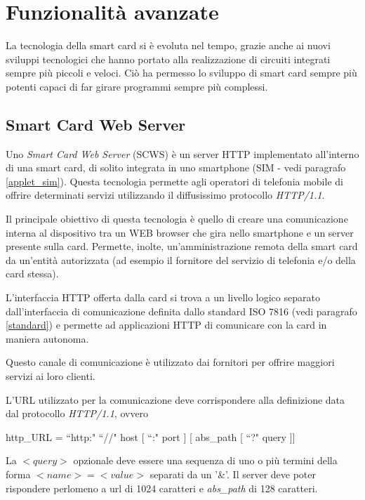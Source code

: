 \section{Funzionalità avanzate}
La tecnologia della smart card si è evoluta nel tempo, grazie anche ai nuovi sviluppi tecnologici che hanno portato alla realizzazione di circuiti integrati sempre più piccoli e veloci. Ciò ha permesso lo sviluppo di smart card sempre più potenti capaci di far girare programmi sempre più complessi.

\subsection{Smart Card Web Server}
\label{smart_card_web_server}
Uno \textit{Smart Card Web Server} (SCWS) è un server HTTP implementato all'interno di una smart card, di solito integrata in uno smartphone (SIM - vedi paragrafo \ref{applet_sim}). Questa tecnologia permette agli operatori di telefonia mobile di offrire determinati servizi utilizzando il diffusissimo protocollo \textit{HTTP/1.1}.

Il principale obiettivo di questa tecnologia è quello di creare una comunicazione interna al dispositivo tra un WEB browser che gira nello smartphone e un server presente sulla card. Permette, inolte, un'amministrazione remota della smart card da un'entità autorizzata (ad esempio il fornitore del servizio di telefonia e/o della card stessa).

L'interfaccia HTTP offerta dalla card si trova a un livello logico separato dall'interfaccia di comunicazione definita dallo standard ISO 7816 (vedi paragrafo \ref{standard}) e permette ad applicazioni HTTP di comunicare con la card in maniera autonoma.

Questo canale di comunicazione è utilizzato dai fornitori per offrire maggiori servizi ai loro clienti.

L'URL utilizzato per la comunicazione deve corrispondere alla definizione data dal protocollo \textit{HTTP/1.1}, ovvero

\begin{center}
    http\_URL = ``http:" ``//" host [ ``:" port ] [ abs\_path [ ``?" query ]]
\end{center}

La $<query>$ opzionale deve essere una sequenza di uno o più termini della forma $<name>=<value>$ separati da un '\&'. Il server deve poter rispondere perlomeno a url di 1024 caratteri e \textit{abs\_path} di 128 caratteri.

